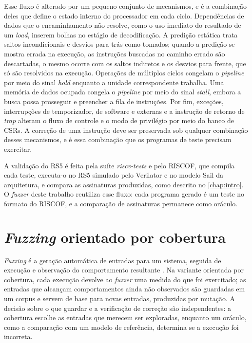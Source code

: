 Esse fluxo é alterado por um pequeno conjunto de mecanismos, e é a combinação deles que define o estado interno do processador em cada ciclo. Dependências de dados que o encaminhamento não resolve, como o uso imediato do resultado de um \textit{load}, inserem bolhas no estágio de decodificação. A predição estática trata saltos incondicionais e desvios para trás como tomados; quando a predição se mostra errada na execução, as instruções buscadas no caminho errado são descartadas, o mesmo ocorre com os saltos indiretos e os desvios para frente, que só são resolvidos na execução. Operações de múltiplos ciclos congelam o \textit{pipeline} por meio do sinal \textit{hold} enquanto a unidade correspondente trabalha. Uma memória de dados ocupada congela o \textit{pipeline} por meio do sinal \textit{stall}, embora a busca possa prosseguir e preencher a fila de instruções. Por fim, exceções, interrupções de temporizador, de software e externas e a instrução de retorno de \textit{trap} alteram o fluxo de controle e o modo de privilégio por meio do banco de CSRs. A correção de uma instrução deve ser preservada sob qualquer combinação desses mecanismos, e é essa combinação que os programas de teste precisam exercitar.

A validação do RS5 é feita pela suíte \textit{riscv-tests} e pelo RISCOF, que compila cada teste, executa-o no RS5 simulado pelo Verilator e no modelo Sail da arquitetura, e compara as assinaturas produzidas, como descrito no \cref{chap:intro}. O \textit{fuzzer} deste trabalho reutiliza esse fluxo: cada programa gerado é um teste no formato do RISCOF, e a comparação de assinaturas permanece como oráculo.

\section{\textit{Fuzzing} orientado por cobertura}\label{sec:bg-fuzzing}

\textit{Fuzzing} é a geração automática de entradas para um sistema, seguida de execução e observação do comportamento resultante \citep{Zeller:2024:FuzzingBook}. Na variante orientada por cobertura, cada execução devolve ao \textit{fuzzer} uma medida do que foi exercitado; as entradas que alcançam comportamentos ainda não observados são guardadas em um corpus e servem de base para novas entradas, produzidas por mutação. A decisão sobre o que guardar e a verificação de correção são independentes: a cobertura escolhe as entradas que merecem ser exploradas, enquanto um oráculo, como a comparação com um modelo de referência, determina se a execução foi incorreta.

